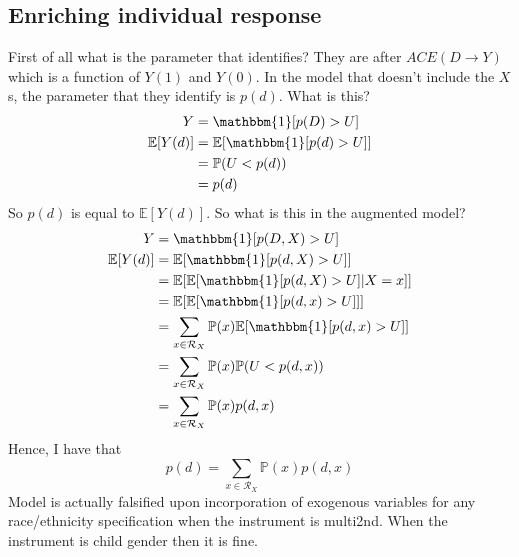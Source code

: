 \documentclass[10pt,a4paper,twoside]{article}
\numberwithin{equation}{section}
\begin{document}
\subsection{Enriching individual response}
First of all what is the parameter that \cite{cr13} identifies? They are after $ACE(D\rightarrow Y)$ which is a function of $Y(1)$ and $Y(0)$. In the model that doesn't include the $X$s, the parameter that they identify is $p(d)$. What is this?
\begin{align*}
Y&=\mathbbm{1}[p(D)>U]\\
\mathbb{E}[Y(d)]&=\mathbb{E}[\mathbbm{1}[p(d)>U]]\\
&=\mathbb{P}(U<p(d))\\
&=p(d)
\end{align*} 
So $p(d)$ is equal to $\mathbb{E}[Y(d)]$. So what is this in the augmented model?
\begin{align*}
Y&=\mathbbm{1}[p(D,X)>U]\\
\mathbb{E}[Y(d)]&=\mathbb{E}[\mathbbm{1}[p(d,X)>U]]\\
&=\mathbb{E}[\mathbb{E}[\mathbbm{1}[p(d,X)>U]|X=x]]\\
&=\mathbb{E}[\mathbb{E}[\mathbbm{1}[p(d,x)>U]]]\\
&=\sum_{x\in\mathcal{R}_X}\mathbb{P}(x)\mathbb{E}[\mathbbm{1}[p(d,x)>U]]\\
&=\sum_{x\in\mathcal{R}_X}\mathbb{P}(x)\mathbb{P}(U<p(d,x))\\
&=\sum_{x\in\mathcal{R}_X}\mathbb{P}(x)p(d,x)
\end{align*} 
Hence, I have that
\[p(d)=\sum_{x\in\mathcal{R}_X}\mathbb{P}(x)p(d,x)\]
Model is actually falsified upon incorporation of exogenous variables for any race/ethnicity specification when the instrument is multi2nd. When the instrument is child gender then it is fine.
\end{document}
